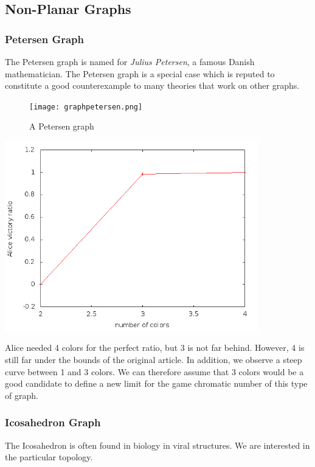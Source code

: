 \subsection{Non-Planar Graphs}

\subsubsection{Petersen Graph}

The Petersen graph is named for \emph{Julius Petersen}, a famous Danish mathematician. The Petersen graph is a special case which is reputed to constitute a good counterexample to many theories that work on other graphs.

\begin{figure}[h]
\begin{center}  
	\texttt{[image: graphpetersen.png]}
\end{center}
    \caption{A Petersen graph}
    \label{petersengraph}
\end{figure}

\includegraphics[width=11cm]{resultats/petersen.png}

Alice needed 4 colors for the perfect ratio, but 3 is not far behind. However, 4 is still far under the bounds of the original article. In addition, we observe a steep curve between 1 and 3 colors. We can therefore assume that 3 colors would be a good candidate to define a new limit for the game chromatic number of this type of graph.

\subsubsection{Icosahedron Graph}

The Icosahedron is often found in biology in viral structures. We are interested in the particular topology.

